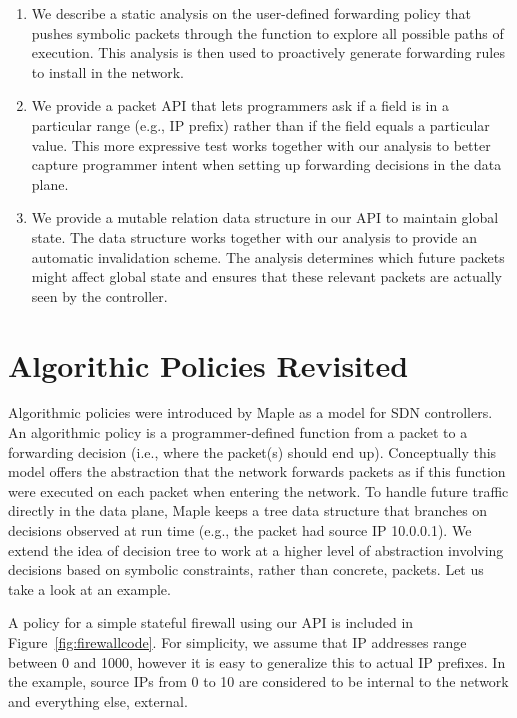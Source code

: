 \documentclass[preprint]{sigplanconf}
\begin{document}
\begin{enumerate}
\item We describe a static analysis on the user-defined forwarding policy that pushes symbolic packets through the function to explore all possible paths of execution. This analysis is then used to proactively generate forwarding rules to install in the network.
\item We provide a packet API that lets programmers ask if a field is in a particular range (e.g., IP prefix) rather than if the field equals a particular value. This more expressive test works together with our analysis to better capture programmer intent when setting up forwarding decisions in the data plane.
\item We provide a mutable relation data structure in our API to maintain global state. The data structure works together with our analysis to provide an automatic invalidation scheme. The analysis determines which future packets might affect global state and ensures that these relevant packets are actually seen by the controller.
\end{enumerate}



\section*{Algorithic Policies Revisited}
Algorithmic policies were introduced by Maple as a model for SDN controllers. An algorithmic policy is a programmer-defined function from a packet to a forwarding decision (i.e., where the packet(s) should end up). Conceptually this model offers the abstraction that the network forwards packets as if this function were executed on each packet when entering the network. To handle future traffic directly in the data plane, Maple keeps a tree data structure that branches on decisions observed at run time (e.g., the packet had source IP 10.0.0.1). We extend the idea of decision tree to work at a higher level of abstraction involving decisions based on symbolic constraints, rather than concrete, packets. Let us take a look at an example.


A policy for a simple stateful firewall using our API is included in Figure~\ref{fig:firewallcode}. For simplicity, we assume that IP addresses range between 0 and 1000, however it is easy to generalize this to actual IP prefixes.
In the example, source IPs from 0 to 10 are considered to be internal to the network and everything else, external. 
\end{document}
